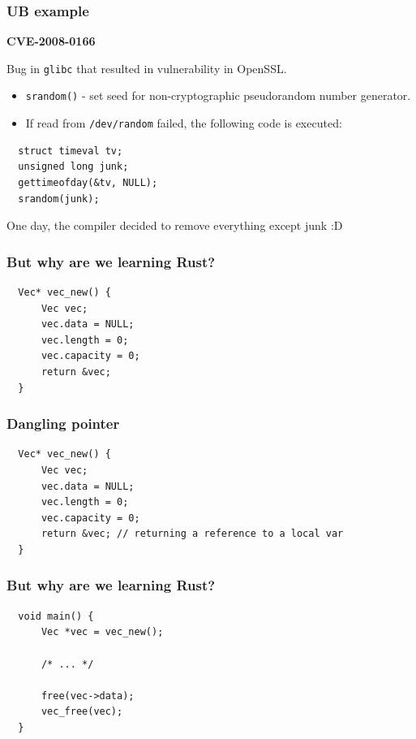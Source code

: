 \documentclass[aspectratio=1610,t]{beamer}
\begin{document}
\begin{frame}[fragile]
\frametitle{UB example}
\textbf{CVE-2008-0166}

Bug in \texttt{glibc} that resulted in vulnerability in OpenSSL.

\begin{itemize}
    \item \texttt{srandom()} - set seed for non-cryptographic pseudorandom number generator.
    \item If read from \texttt{/dev/random} failed, the following code is executed:
\end{itemize}

\begin{verbatim}
  struct timeval tv;
  unsigned long junk;
  gettimeofday(&tv, NULL);
  srandom(junk);
\end{verbatim}

One day, the compiler decided to remove everything except junk :D

\end{frame}



\begin{frame}[fragile]
\frametitle{But why are we learning Rust?}

\begin{verbatim}
  Vec* vec_new() {
      Vec vec;
      vec.data = NULL;
      vec.length = 0;
      vec.capacity = 0;
      return &vec;
  }
\end{verbatim}

\end{frame}



\begin{frame}[fragile]
\frametitle{Dangling pointer}

\begin{verbatim}
  Vec* vec_new() {
      Vec vec;
      vec.data = NULL;
      vec.length = 0;
      vec.capacity = 0;
      return &vec; // returning a reference to a local var
  }
\end{verbatim}

\end{frame}


\begin{frame}[fragile]
\frametitle{But why are we learning Rust?}

\begin{verbatim}
  void main() {
      Vec *vec = vec_new();

      /* ... */

      free(vec->data);
      vec_free(vec);
  }
\end{verbatim}

\end{frame}
\end{document}
